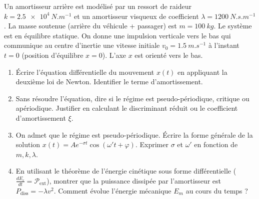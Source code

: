 \documentclass[11pt]{article}
\begin{document}
\begin{exercice}
Un amortisseur arrière est modélisé par un ressort de raideur $k = \SI{2,5e4}{N.m^{-1}}$ et un amortisseur visqueux de coefficient $\lambda = \SI{1200}{N.s.m^{-1}}$. La masse soutenue (arrière du véhicule + passager) est $m = \SI{100}{kg}$. Le système est en équilibre statique. On donne une impulsion verticale vers le bas qui communique au centre d'inertie une vitesse initiale $v_0 = \SI{1,5}{m.s^{-1}}$ à l'instant $t=0$ (position d'équilibre $x=0$). L'axe $x$ est orienté vers le bas.
\begin{enumerate}
    \item Écrire l'équation différentielle du mouvement $x(t)$ en appliquant la deuxième loi de Newton. Identifier le terme d'amortissement.
    \item Sans résoudre l'équation, dire si le régime est pseudo-périodique, critique ou apériodique. Justifier en calculant le discriminant réduit ou le coefficient d'amortissement $\xi$.
    \item On admet que le régime est pseudo-périodique. Écrire la forme générale de la solution $x(t) = A e^{-\sigma t} \cos(\omega' t + \varphi)$. Exprimer $\sigma$ et $\omega'$ en fonction de $m, k, \lambda$.
    \item En utilisant le théorème de l'énergie cinétique sous forme différentielle ($\frac{dE_c}{dt} = \mathcal{P}_{\text{ext}}$), montrer que la puissance dissipée par l'amortisseur est $P_{\text{diss}} = -\lambda v^2$. Comment évolue l'énergie mécanique $E_m$ au cours du temps ?
\end{enumerate}
\end{exercice}
\end{document}
